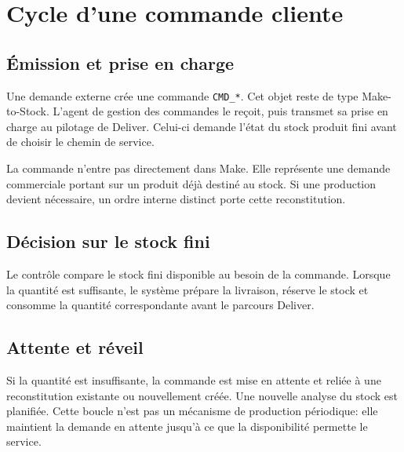 \chapter{Cycle d'une commande cliente}
\label{chap:cycle-commande}

\section{Émission et prise en charge}

Une demande externe crée une commande \texttt{CMD\_*}. Cet objet reste de type Make-to-Stock. L'agent de gestion des commandes le reçoit, puis transmet sa prise en charge au pilotage de Deliver. Celui-ci demande l'état du stock produit fini avant de choisir le chemin de service.

La commande n'entre pas directement dans Make. Elle représente une demande commerciale portant sur un produit déjà destiné au stock. Si une production devient nécessaire, un ordre interne distinct porte cette reconstitution.


\section{Décision sur le stock fini}

Le contrôle compare le stock fini disponible au besoin de la commande. Lorsque la quantité est suffisante, le système prépare la livraison, réserve le stock et consomme la quantité correspondante avant le parcours Deliver.

\section{Attente et réveil}

Si la quantité est insuffisante, la commande est mise en attente et reliée à une reconstitution existante ou nouvellement créée. Une nouvelle analyse du stock est planifiée. Cette boucle n'est pas un mécanisme de production périodique: elle maintient la demande en attente jusqu'à ce que la disponibilité permette le service.

